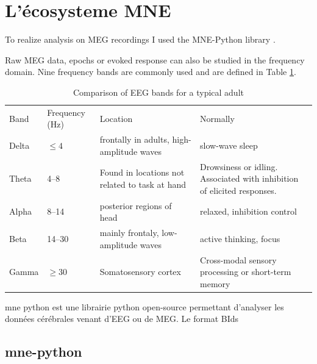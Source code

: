 \section{L'écosysteme MNE}

To realize analysis on MEG recordings I used the MNE-Python library \cite{GramfortEtAl2013a}.

Raw MEG data, epochs or evoked response can also be studied in the frequency domain. Nine
frequency bands are commonly used and are defined in Table \ref{Tab:neural_freq_band}.

\begin{table}[ht]
    \caption{Comparison of EEG bands for a typical adult}
    \centering
    \begin{tabular}{@{}| p{1.2cm}|p{2.5cm}| p{4.5cm}|p{4.5cm}| @{}}
        \hline
        Band  & Frequency (Hz) & Location                                       & Normally                                                                \\
        Delta & $\leq  4$      & frontally in adults, high-amplitude waves      & slow-wave sleep                                                         \\
        Theta & 4–8            & Found in locations not related to task at hand & Drowsiness or idling. Associated with inhibition of elicited responses. \\
        Alpha & 8–14           & posterior regions of head                      & relaxed, inhibition control                                             \\
        Beta  & 14–30          & mainly frontaly, low-amplitude waves           & active thinking, focus                                                  \\
        Gamma & $\geq 30$      & Somatosensory cortex                           & Cross-modal sensory processing or short-term memory                     \\
        \hline
    \end{tabular}
    \label{Tab:neural_freq_band}
\end{table}


mne python est une librairie python open-source permettant d'analyser les données cérébrales venant d'EEG ou de MEG. Le format BIds

\subsection{mne-python}


